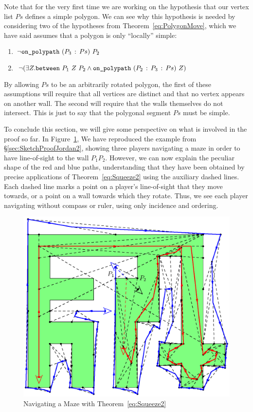 Note that for the very first time we are working on the hypothesis that our vertex list $Ps$ defines a simple polygon. We can see why this hypothesis is needed by considering two of the hypotheses from Theorem~\ref{eq:PolygonMove}, which we have said assumes that a polygon is only ``locally'' simple:
\begin{enumerate}
\item $\neg\code{on\_polypath}\ (\cons{P_3}{Ps})\ P_2$
\item $\neg(\exists Z. \between{P_1}{Z}{P_2} \wedge \code{on\_polypath}\ (\cons{P_2}{\cons{P_3}{Ps}})\ Z)$
\end{enumerate}

By allowing $Ps$ to be an arbitrarily rotated polygon, the first of these assumptions will require that all vertices are distinct and that no vertex appears on another wall. The second will require that the walls themselves do not intersect. This is just to say that the polygonal segment $Ps$ must be simple.

To conclude this section, we will give some perspective on what is involved in the proof so far. In Figure~\ref{fig:SketchProofJordan2Full}, We have reproduced the example from \S\ref{sec:SketchProofJordan2}, showing three players navigating a maze in order to have line-of-sight to the wall $P_1P_2$. However, we can now explain the peculiar shape of the red and blue paths, understanding that they have been obtained by precise applications of Theorem~\ref{eq:Squeeze2} using the auxiliary dashed lines. Each dashed line marks a point on a player's line-of-sight that they move towards, or a point on a wall towards which they rotate. Thus, we see each player navigating without compass or ruler, using only incidence and ordering.

\begin{figure}
  \centering\includegraphics{jordanVerification2/SketchProofFull}
  \caption{Navigating a Maze with Theorem~\ref{eq:Squeeze2}}
  \label{fig:SketchProofJordan2Full}
\end{figure}

